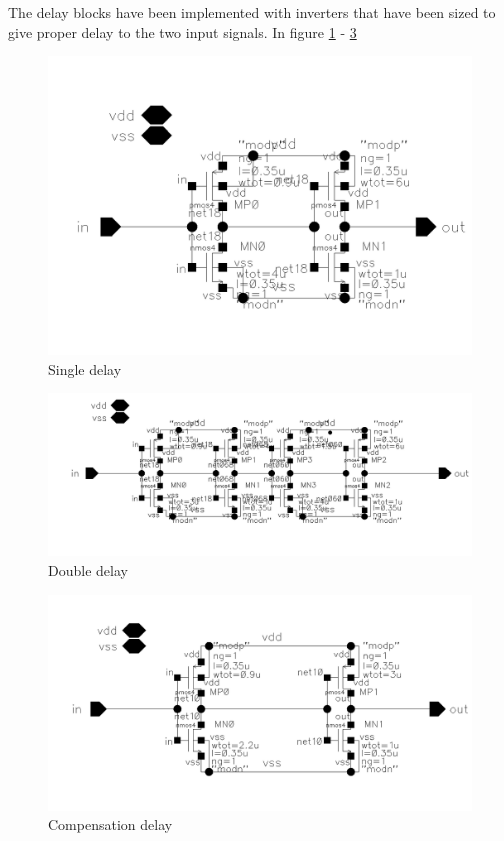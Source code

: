 \documentclass[a4paper,12pt]{article} \usepackage{graphicx}
\begin{document}
The delay blocks have been implemented with inverters that have been
sized to give proper delay to the two input signals. In figure
\ref{fig:s_delay} - \ref{fig:c_delay}

\begin{figure}[h]
        \centering
        \includegraphics[width=150mm]{../Bilder/LD_tran/single_delay.png}
        \caption{Single delay}
        \label{fig:s_delay}
\end{figure}

\begin{figure}[h]
        \centering
        \includegraphics[width=150mm]{../Bilder/LD_tran/double_delay.png}
        \caption{Double delay}
        \label{fig:d_delay}
\end{figure}

\begin{figure}[h]
        \centering
        \includegraphics[width=150mm]{../Bilder/LD_tran/compensation_delay.png}
        \caption{Compensation delay}
        \label{fig:c_delay}
\end{figure}
\end{document}
